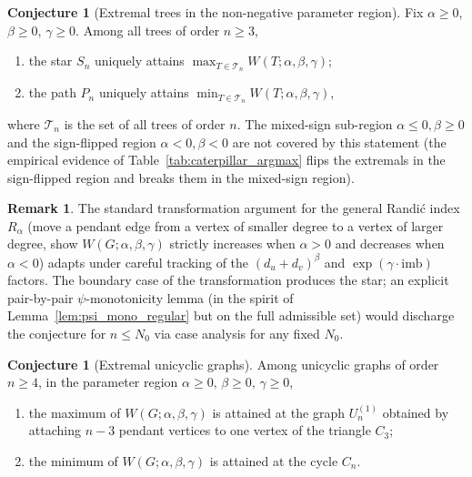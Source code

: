 \documentclass[11pt,a4paper]{article}
\theoremstyle{definition}
\newtheorem{conjecture}[theorem]{Conjecture}
\newtheorem{remark}[theorem]{Remark}
\newcommand{\Wuzi}{W(G;\alpha,\beta,\gamma)}
\begin{document}
\begin{conjecture}[Extremal trees in the non-negative parameter region]
\label{conj:trees_beta_pos}
Fix $\alpha \ge 0$, $\beta \ge 0$, $\gamma \ge 0$. Among all trees
of order $n \ge 3$,
\begin{enumerate}[label=(\alph*)]
\item the star $S_n$ uniquely attains $\max_{T \in \mathcal{T}_n} W(T;\alpha,\beta,\gamma)$;
\item the path $P_n$ uniquely attains $\min_{T \in \mathcal{T}_n} W(T;\alpha,\beta,\gamma)$,
\end{enumerate}
where $\mathcal{T}_n$ is the set of all trees of order $n$. The
mixed-sign sub-region $\alpha \le 0, \beta \ge 0$ and the
sign-flipped region $\alpha < 0, \beta < 0$ are not covered by this
statement (the empirical evidence of
Table~\ref{tab:caterpillar_argmax} flips the extremals in the
sign-flipped region and breaks them in the mixed-sign region).
\end{conjecture}

\begin{remark}\label{rem:trees_strategy}
The standard transformation argument for the general Randi\'c
index $R_\alpha$ (move a pendant edge from a vertex of smaller
degree to a vertex of larger degree, show $\Wuzi$ strictly
increases when $\alpha > 0$ and decreases when $\alpha < 0$)
adapts under careful tracking of the $(d_u + d_v)^\beta$ and
$\exp(\gamma\cdot\mathrm{imb})$ factors. The boundary case of the
transformation produces the star; an explicit pair-by-pair
$\psi$-monotonicity lemma (in the spirit of
Lemma~\ref{lem:psi_mono_regular} but on the full admissible set)
would discharge the conjecture for $n \le N_0$ via case analysis
for any fixed $N_0$.
\end{remark}

\begin{conjecture}[Extremal unicyclic graphs]\label{conj:unicyclic}
Among unicyclic graphs of order $n \ge 4$, in the parameter region
$\alpha \ge 0,\, \beta \ge 0,\, \gamma \ge 0$,
\begin{enumerate}[label=(\alph*)]
\item the maximum of $\Wuzi$ is attained at the graph $U_n^{(1)}$
obtained by attaching $n - 3$ pendant vertices to one vertex of
the triangle $C_3$;
\item the minimum of $\Wuzi$ is attained at the cycle $C_n$.
\end{enumerate}
\end{conjecture}
\end{document}

